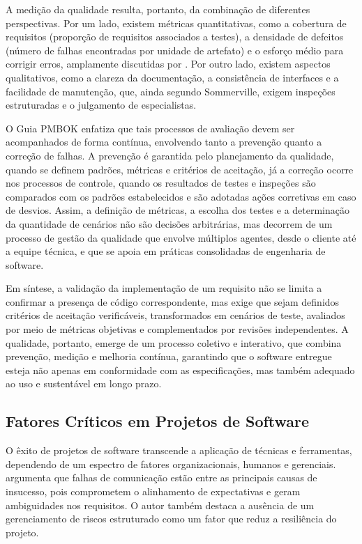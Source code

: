 A medição da qualidade resulta, portanto, da combinação de diferentes perspectivas. Por um lado, existem métricas quantitativas, como a cobertura de requisitos (proporção de requisitos associados a testes), a densidade de defeitos (número de falhas encontradas por unidade de artefato) e o esforço médio para corrigir erros, amplamente discutidas por . Por outro lado, existem aspectos qualitativos, como a clareza da documentação, a consistência de interfaces e a facilidade de manutenção, que, ainda segundo Sommerville, exigem inspeções estruturadas e o julgamento de especialistas.

O Guia PMBOK \cite{pmi2008} enfatiza que tais processos de avaliação devem ser acompanhados de forma contínua, envolvendo tanto a prevenção quanto a correção de falhas. A prevenção é garantida pelo planejamento da qualidade, quando se definem padrões, métricas e critérios de aceitação, já a correção ocorre nos processos de controle, quando os resultados de testes e inspeções são comparados com os padrões estabelecidos e são adotadas ações corretivas em caso de desvios. Assim, a definição de métricas, a escolha dos testes e a determinação da quantidade de cenários não são decisões arbitrárias, mas decorrem de um processo de gestão da qualidade que envolve múltiplos agentes, desde o cliente até a equipe técnica, e que se apoia em práticas consolidadas de engenharia de software.

Em síntese, a validação da implementação de um requisito não se limita a confirmar a presença de código correspondente, mas exige que sejam definidos critérios de aceitação verificáveis, transformados em cenários de teste, avaliados por meio de métricas objetivas e complementados por revisões independentes. A qualidade, portanto, emerge de um processo coletivo e interativo, que combina prevenção, medição e melhoria contínua, garantindo que o software entregue esteja não apenas em conformidade com as especificações, mas também adequado ao uso e sustentável em longo prazo.

\subsection{Fatores Críticos em Projetos de Software}

O êxito de projetos de software transcende a aplicação de técnicas e ferramentas, dependendo de um espectro de fatores organizacionais, humanos e gerenciais.  argumenta que falhas de comunicação estão entre as principais causas de insucesso, pois comprometem o alinhamento de expectativas e geram ambiguidades nos requisitos. O autor também destaca a ausência de um gerenciamento de riscos estruturado como um fator que reduz a resiliência do projeto.

